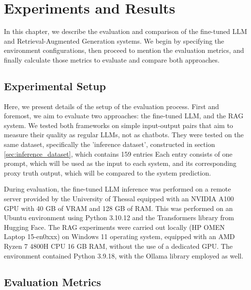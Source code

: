 \chapter{Experiments and Results}
\label{chap5}


In this chapter, we describe the evaluation and comparison of the fine-tuned LLM and Retrieval-Augmented Generation systems. We begin by specifying the environment configurations, then proceed to mention the evaluation metrics, and finally calculate those metrics to evaluate and compare both approaches. 


\section{Experimental Setup}


Here, we present details of the setup of the evaluation process. First and foremost, we aim to evaluate two approaches: the fine-tuned LLM, and the RAG system. We tested both frameworks on simple input-output pairs that aim to measure their quality as regular LLMs, not as chatbots. They were tested on the same dataset, specifically the 'inference dataset', constructed in section \ref{sec:inference_dataset}, which contains 159 entries Each entry consists of one prompt, which will be used as the input to each system, and its corresponding proxy truth output, which will be compared to the system prediction. 

During evaluation, the fine-tuned LLM inference was performed on a remote server provided by the University of Thessal equipped with an NVIDIA A100 GPU with 40 GB of VRAM and 128 GB of RAM. This was performed on an Ubuntu environment using Python 3.10.12 and the Transformers library from Hugging Face. The RAG experiments were carried out locally (HP OMEN Laptop 15-en0xxx) on Windows 11 operating system, equipped with an AMD Ryzen 7 4800H CPU 16 GB RAM, without the use of a dedicated GPU. The environment contained Python 3.9.18, with the Ollama library employed as well.


\section{Evaluation Metrics}

